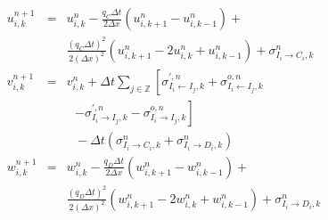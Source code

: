 \documentclass[journal]{IEEEtran}
\begin{document}
\begin{eqnarray*}
    u_{i,k}^{n+1} &=& u_{i,k}^{n} - \frac{q_C \Delta t}{2 \Delta x}\left(u_{i,k+1}^{n} - u_{i,k-1}^{n} \right) + \\
    && \frac{(q_C \Delta t)^2}{2 (\Delta x)^2}\left(u_{i,k+1}^{n} - 2u_{i,k}^{n} + u_{i,k-1}^{n} \right) + \sigma_{I_i \rightarrow C_i,k}^n \\
    v_{i,k}^{n+1} &=& v_{i,k}^{n} + \Delta t \sum_{j\in\mathbb{Z}} \left[ \sigma_{I_i \leftarrow I_j,k}^{\prime,n} + \sigma_{I_i \leftarrow I_j,k}^{o,n} \right. \\
    & & ~~~ \left. - \sigma_{I_i \rightarrow I_j,k}^{\prime,n} - \sigma_{I_i \rightarrow I_j,k}^{o,n} \right] \\
    && ~~~ - \Delta t \left( \sigma_{I_i \rightarrow C_i,k}^n + \sigma_{I_i \rightarrow D_i,k}^n \right) \\
    w_{i,k}^{n+1} &=& w_{i,k}^{n} - \frac{q_D \Delta t}{2 \Delta x}\left(w_{i,k+1}^{n} - w_{i,k-1}^{n} \right) + \\
    && \frac{(q_D \Delta t)^2}{2 (\Delta x)^2}\left(w_{i,k+1}^{n} - 2w_{i,k}^{n} + w_{i,k-1}^{n} \right) + \sigma_{I_i \rightarrow D_i,k}^n \\   
\end{eqnarray*}



\end{document}
